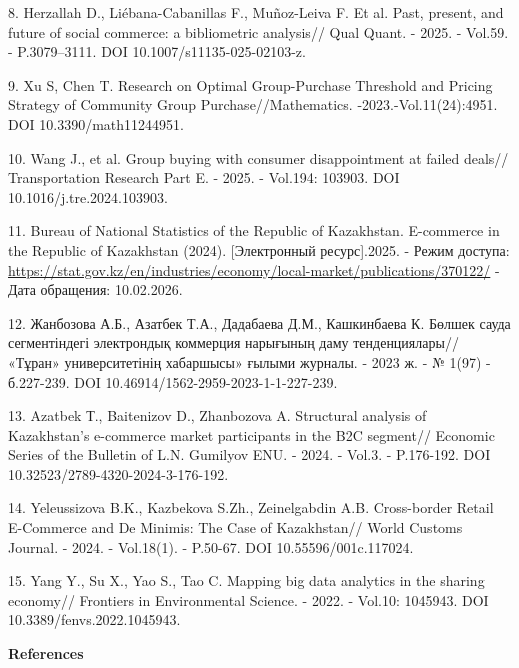 \begin{refs}
8. Herzallah D., Liébana-Cabanillas F., Muñoz-Leiva F. Et al. Past,
present, and future of social commerce: a bibliometric analysis// Qual
Quant. - 2025. - Vol.59. - P.3079--3111. DOI
10.1007/s11135-025-02103-z.

9. Xu S, Chen T. Research on Optimal Group-Purchase Threshold and
Pricing Strategy of Community Group Purchase//Mathematics.
-2023.-Vol.11(24):4951. DOI 10.3390/math11244951.

10. Wang J., et al. Group buying with consumer disappointment at failed
deals// Transportation Research Part E. - 2025. - Vol.194: 103903. DOI
10.1016/j.tre.2024.103903.

11. Bureau of National Statistics of the Republic of Kazakhstan.
E-commerce in the Republic of Kazakhstan (2024). {[}Электронный
ресурс{]}.2025. - Режим доступа:
\url{https://stat.gov.kz/en/industries/economy/local-market/publications/370122/}
- Дата обращения: 10.02.2026.

12. Жанбозова А.Б., Азатбек Т.А., Дадабаева Д.М., Кашкинбаева К. Бөлшек
сауда сегментіндегі электрондық коммерция нарығының даму тенденциялары//
«Тұран» университетінің хабаршысы» ғылыми журналы. - 2023 ж. - № 1(97) -
б.227-239. DOI 10.46914/1562-2959-2023-1-1-227-239.

13. Azatbek Т., Baitenizov D., Zhanbozova A. Structural analysis of
Kazakhstan's e-commerce market participants in the B2C segment//
Economic Series of the Bulletin of L.N. Gumilyov ENU. - 2024. - Vol.3.
- P.176-192. DOI 10.32523/2789-4320-2024-3-176-192.

14. Yeleussizova B.K., Kazbekova S.Zh., Zeinelgabdin A.B. Cross-border
Retail E-Commerce and De Minimis: The Case of Kazakhstan// World Customs
Journal. - 2024. - Vol.18(1). - P.50-67. DOI
10.55596/001c.117024.

15. Yang Y., Su X., Yao S., Tao C. Mapping big data analytics in the
sharing economy// Frontiers in Environmental Science. - 2022. - Vol.10:
1045943. DOI 10.3389/fenvs.2022.1045943.
\end{refs}

\begin{center}
{\bfseries References}
\end{center}

